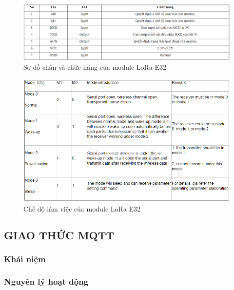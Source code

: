 \begin{figure}[H]
	\centering
	\includegraphics[scale=.5]{Chapter 2/image chapter 2/sodochanvachucnangE32.png}
	\caption[Sơ đồ chân và chức năng của module LoRa E32]{Sơ đồ chân và chức năng của module LoRa E32}
	\label{hinh23}
\end{figure}
\begin{figure}[H]
	\centering
	\includegraphics[scale=.5]{Chapter 2/image chapter 2/workmodeE32.png}
	\caption[Chế độ làm việc của module LoRa E32]{Chế độ làm việc của module LoRa E32}
	\label{hinh24}
\end{figure}


\subsection{GIAO THỨC MQTT}
\subsubsection{Khái niệm}
\subsubsection{Nguyên lý hoạt động}
